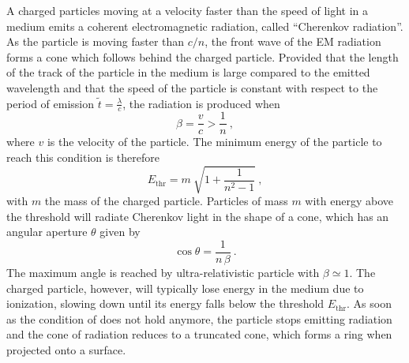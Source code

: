 A charged particles moving at a velocity faster than the speed of light in a medium %
emits a coherent electromagnetic radiation, called ``Cherenkov radiation''. %
As the particle is moving faster than $c / n$, the front wave of the EM radiation forms a cone %
which follows behind the charged particle.
Provided that the length of the track of the particle in the medium is large compared to the emitted wavelength %
and that the speed of the particle is constant with respect to the period of emission $\tilde{t} = \frac{\lambda}{c}$,
the radiation is produced when
\begin{equation}
	\label{eq:cherenkov}
	\beta = \frac{v}{c} > \frac{1}{n}\ ,
\end{equation}
where $v$ is the velocity of the particle.
The minimum energy of the particle to reach this condition is therefore
\begin{equation}
	\label{eq:cherenkov_threshold}
	E_\text{thr} = m\ \sqrt{1 + \frac{1}{n^2-1}}\ ,
\end{equation}
with $m$ the mass of the charged particle.
Particles of mass $m$ with energy above the threshold will radiate Cherenkov light in the shape of a cone, %
which has an angular aperture $\theta$ given by
\begin{equation}
	\cos \theta = \frac{1}{n\,\beta} \ .
\end{equation}
The maximum angle is reached by ultra-relativistic particle with $\beta \simeq 1$.
The charged particle, however, will typically lose energy in the medium due to ionization, %
slowing down until its energy falls below the threshold $E_\text{thr}$.
As soon as the condition of  does not hold anymore, %
the particle stops emitting radiation and the cone of radiation reduces to a truncated cone, %
which forms a ring when projected onto a surface.

